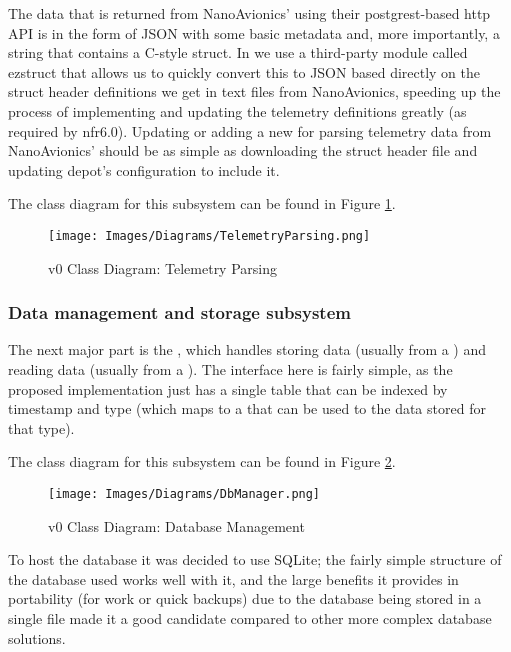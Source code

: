 The data that is returned from NanoAvionics’ using their \Gls{postgrest}-based \acrshort{http} API is in the form of JSON with some basic \gls{metadata} and, more importantly, a string that contains a  C-style \gls{struct}. In  we use a third-party module called \gls{ezstruct} that allows us to quickly convert this to JSON based directly on the \gls{struct} header definitions we get in text files from NanoAvionics, speeding up the process of implementing and updating the telemetry definitions greatly (as required by \acrshort{nfr}6.0). Updating or adding a new  for parsing telemetry data from NanoAvionics’ should be as simple as downloading the \gls{struct} header file and updating \Gls{depot}'s configuration to include it.

The class diagram for this subsystem can be found in Figure \ref{fig:cdparsing}.

\begin{figure}[H]
  \centering
  \texttt{[image: Images/Diagrams/TelemetryParsing.png]}
  \caption{v0 Class Diagram: Telemetry Parsing}
  \label{fig:cdparsing}
\end{figure}

\subsubsection{Data management and storage subsystem}
The next major part is the , which handles storing data (usually from a ) and reading data (usually from a ). The interface here is fairly simple, as the proposed implementation just has a single table that can be indexed by timestamp and type (which maps to a  that can be used to  the data stored for that type).


The class diagram for this subsystem can be found in Figure \ref{fig:cddb}.

\begin{figure}[H]
  \centering
  \texttt{[image: Images/Diagrams/DbManager.png]}
  \caption{v0 Class Diagram: Database Management}
  \label{fig:cddb}
\end{figure}

To host the database it was decided to use SQLite; the fairly simple structure of the database used works well with it, and the large benefits it provides in portability (for  work or quick backups) due to the database being stored in a single file made it a good candidate compared to other more complex database solutions.

